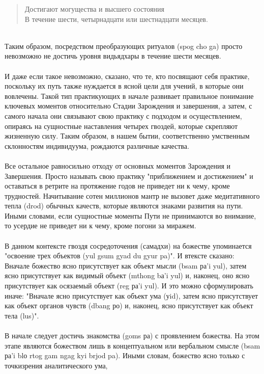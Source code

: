 \begin{siderules}
\begin{verse}
Достигают могущества и высшего состояния\\
В течение шести, четырнадцати или шестнадцати месяцев.\\
\end{verse}
\\
Таким образом, посредством преобразующих ритуалов (spog cho ga) просто невозможно не
достичь уровня видьядхары в течение шести месяцев.\\
\\
И даже если такое невозможно, сказано, что те, кто посвящают себя практике, поскольку их
путь также нуждается в ясной цели для учений, в которые они вовлечены. Такой тип
практикующих в начале развивает правильное понимание ключевых моментов относительно
Стадии Зарождения и завершения, а затем, с самого начала они связывают свою практику с
подходом и осуществлением, опираясь на сущностные наставления четырех гвоздей,
которые скрепляют жизненную силу. Таким образом, в нашем бытии, соответственно
умственным склонностям индивидуума, рождаются различные качества.\\
\\
Все остальное равносильно отходу от основных моментов Зарождения и Завершения. Просто
называть свою практику "приближением и достижением" и оставаться в ретрите на
протяжение годов не приведет ни к чему, кроме трудностей. Начитывание сотен миллионов
мантр не вызовет даже медитативного тепла (drod) обычных качеств, которые являются
знаками развития на пути. Иными словами, если сущностные моменты Пути не
принимаются во внимание, то усердие не приведет ни к чему, кроме погони за миражем.\\
\\
В данном контексте гвоздя сосредоточения (самадхи) на божестве упоминается "освоение трех объектов (yul gsum gyad du gyur pa)".
И втексте сказано: Вначале божество ясно присутствует как объект мысли (bsam ра'i yul),
затем ясно присутствует как видимый объект (mthong bа'i yul) и, наконец, оно ясно
присутствует как осязаемый объект (reg ра'i yul). И это можно сформулировать иначе:
"Вначале ясно присутствует как объект ума (уid), затем ясно присутствует как объект
органов чувств (dbang ро) и, наконец, ясно присутствует как объект тела (lus)".\\
\\
В начале следует достичь знакомства (goms ра) с проявлением божества. На этом этапе
являются божеством лишь в концептуальном или вербальном смысле (bsam ра'i blо rtog gam ngag kyi brjod pa).
Иными словам, божество ясно только с точкизрения аналитического ума,

\end{siderules}
